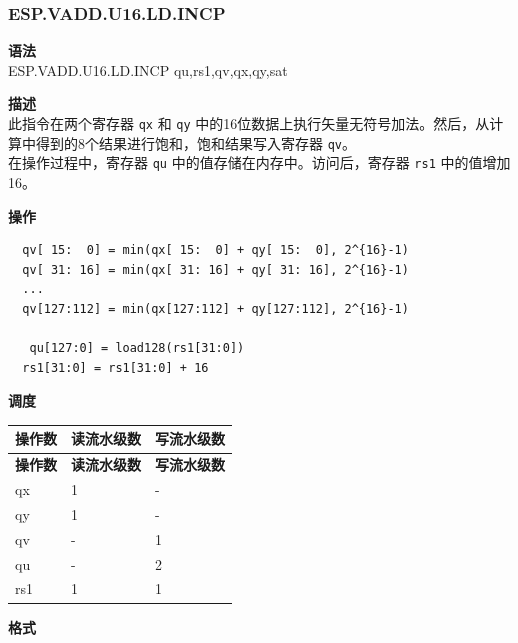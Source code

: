 \newpage

\newpage
\subsubsection{ESP.VADD.U16.LD.INCP}\label{instruction:ESPVADDU16LDINCP}
\textbf{语法}\\
ESP.VADD.U16.LD.INCP qu,rs1,qv,qx,qy,sat

\textbf{描述}\\
此指令在两个寄存器 \lstinline{qx} 和 \lstinline{qy} 中的16位数据上执行矢量无符号加法。然后，从计算中得到的8个结果进行饱和，饱和结果写入寄存器 \lstinline{qv}。\\ 在操作过程中，寄存器 \lstinline{qu} 中的值存储在内存中。访问后，寄存器 \lstinline{rs1} 中的值增加16。

\textbf{操作}\\
\begin{lstlisting}
  qv[ 15:  0] = min(qx[ 15:  0] + qy[ 15:  0], 2^{16}-1)
  qv[ 31: 16] = min(qx[ 31: 16] + qy[ 31: 16], 2^{16}-1)
  ...
  qv[127:112] = min(qx[127:112] + qy[127:112], 2^{16}-1)

   qu[127:0] = load128(rs1[31:0])
  rs1[31:0] = rs1[31:0] + 16
\end{lstlisting}


\textbf{调度}\\
\begin{longtable}[c]{|l|l|l|}
    \hline
    \rowcolor{lightgray}
    \textbf{操作数} & \textbf{读流水级数} & \textbf{写流水级数} \\\hline
    \endfirsthead
    \hline
    \rowcolor{lightgray}
     \textbf{操作数} & \textbf{读流水级数} & \textbf{写流水级数} \\\hline
    \endhead
    \hline
    \endfoot

    qx & 1 & - \\\hline
  qy & 1 & - \\\hline
     qv & - & 1 \\\hline
     qu & - & 2 \\\hline
     rs1 & 1 & 1

\end{longtable}

\textbf{格式}\\

